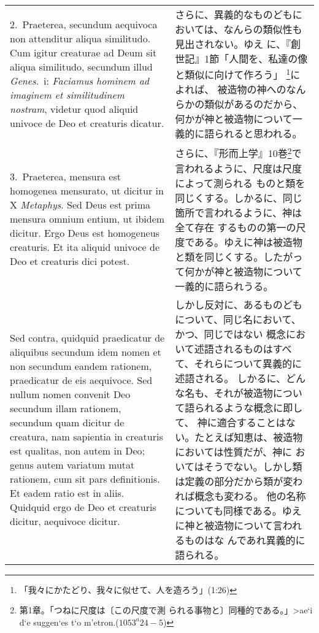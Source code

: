 \documentclass[10pt]{jsarticle}
\begin{document}
\begin{longtable}{p{21em}p{21em}}
\\

2.~{\sc Praeterea}, secundum aequivoca non attenditur aliqua
similitudo. Cum igitur creaturae ad Deum sit aliqua similitudo,
secundum illud {\it Genes}.\ {\sc i}: {\it Faciamus hominem ad
imaginem et similitudinem nostram}, videtur quod aliquid univoce de
Deo et creaturis dicatur.

&

さらに、異義的なものどもにおいては、なんらの類似性も見出されない。ゆえ
に、『創世記』1節「人間を、私達の像と類似に向けて作ろう」
\footnote{「我々にかたどり、我々に似せて、人を造ろう」(1:26)}によれば、
被造物の神へのなんらかの類似があるのだから、何かが神と被造物について一
義的に語られると思われる。

\\

3.~{\sc Praeterea}, mensura est homogenea mensurato, ut dicitur in X
{\it Metaphys}. Sed Deus est prima mensura omnium entium, ut ibidem
dicitur. Ergo Deus est homogeneus creaturis. Et ita aliquid univoce de
Deo et creaturis dici potest.

&

さらに、『形而上学』10巻\footnote{第1章。「つねに尺度は〔この尺度で測
られる事物と〕同種的である。」\textgreek{>ae`i d`e suggen`es t`o
m'etron.}($1053^{a}24-5$)}で言われるように、尺度は尺度によって測られる
ものと類を同じくする。しかるに、同じ箇所で言われるように、神は全て存在
するものの第一の尺度である。ゆえに神は被造物と類を同じくする。したがっ
て何かが神と被造物について一義的に語られうる。

\\

{\sc Sed contra}, quidquid praedicatur de aliquibus secundum idem
nomen et non secundum eandem rationem, praedicatur de eis
aequivoce. Sed nullum nomen convenit Deo secundum illam rationem,
secundum quam dicitur de creatura, nam sapientia in creaturis est
qualitas, non autem in Deo; genus autem variatum mutat rationem, cum
sit pars definitionis. Et eadem ratio est in aliis. Quidquid ergo de
Deo et creaturis dicitur, aequivoce dicitur.

&

しかし反対に、あるものどもについて、同じ名において、かつ、同じではない
概念において述語されるものはすべて、それらについて異義的に述語される。
しかるに、どんな名も、それが被造物について語られるような概念に即して、
神に適合することはない。たとえば知恵は、被造物においては性質だが、神に
おいてはそうでない。しかし類は定義の部分だから類が変われば概念も変わる。
他の名称についても同様である。ゆえに神と被造物について言われるものはな
んであれ異義的に語られる。


\end{longtable}
\end{document}
